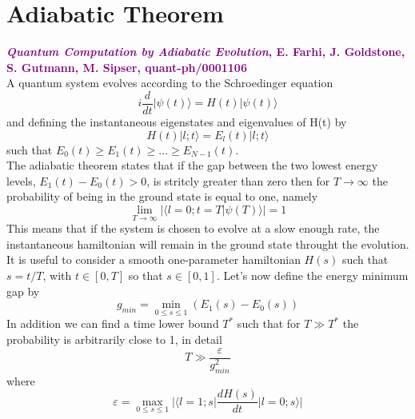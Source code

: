 \documentclass[11pt, twoside]{report}
\newcommand{\purple}[3]{\textcolor{purple}{\textbf{\textit{#1}, #2, #3}}}
\begin{document}
\section{Adiabatic Theorem}
\purple{Quantum Computation by Adiabatic Evolution}{E. Farhi, J. Goldstone, S. Gutmann, M. Sipser}{quant-ph/0001106}\\


A quantum system evolves according to the Schroedinger equation
\begin{equation}
    i\frac{d}{dt}|\psi(t)\rangle = H(t)|\psi(t)\rangle
\end{equation}
and defining the instantaneous eigenstates and eigenvalues of H(t) by
\begin{equation}
    H(t)|l;t\rangle = E_l(t)|l;t\rangle
\end{equation}
such that $E_0(t) \geq E_1(t) \geq ... \geq E_{N-1}(t)$. \\
The adiabatic theorem states that if the gap between the two lowest energy levels, $E_{1}(t) - E_{0}(t) > 0$, is stritcly greater than zero then for $T\rightarrow \infty$ the probability of being in the ground state is equal to one, namely
\begin{equation}
    \lim_{T \to \infty} |\langle l=0;t = T | \psi(T)\rangle| = 1
\end{equation}
This means that if the system is chosen to evolve at a slow enough rate, the instantaneous hamiltonian will remain in the ground state throught the evolution. It is useful to consider a smooth one-parameter hamiltonian $H(s)$ such that $s=t/T$, with $t \in [0,T]$ so that $s \in [0,1]$.
Let's now define the energy minimum gap by
\begin{equation}
    g_{min} = \min_{0 \leq s \leq 1} (E_1(s)-E_0(s))
\end{equation}
In addition we can find a time lower bound $T^*$ such that for $T\gg T^{*}$ the probability is arbitrarily close to 1, in detail
\begin{equation}
    T \gg \frac{\varepsilon}{g^{2}_{min}}
\end{equation}
where
\begin{equation}
    \varepsilon = \max_{0 \leq s \leq 1} \Big| \Big\langle l=1;s\Big| \frac{dH(s)}{dt} \Big| l=0;s\Big\rangle\Big|
\end{equation}
\end{document}
